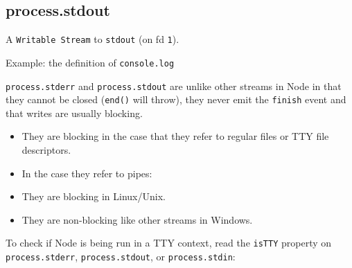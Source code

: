 \subsection{process.stdout}\label{process.stdout}

A \texttt{Writable\ Stream} to \texttt{stdout} (on fd \texttt{1}).

Example: the definition of \texttt{console.log}

\begin{Shaded}
\begin{Highlighting}[]
 \NormalTok{= }
  \NormalTok{);}
\NormalTok{\};}
\end{Highlighting}
\end{Shaded}

\texttt{process.stderr} and \texttt{process.stdout} are unlike other
streams in Node in that they cannot be closed (\texttt{end()} will
throw), they never emit the \texttt{finish} event and that writes are
usually blocking.

\begin{itemize}
\itemsep1pt\parskip0pt
\item
  They are blocking in the case that they refer to regular files or TTY
  file descriptors.
\item
  In the case they refer to pipes:
\item
  They are blocking in Linux/Unix.
\item
  They are non-blocking like other streams in Windows.
\end{itemize}

To check if Node is being run in a TTY context, read the \texttt{isTTY}
property on \texttt{process.stderr}, \texttt{process.stdout}, or
\texttt{process.stdin}:

\begin{Shaded}
\begin{Highlighting}[]
 

 
\end{Highlighting}
\end{Shaded}

